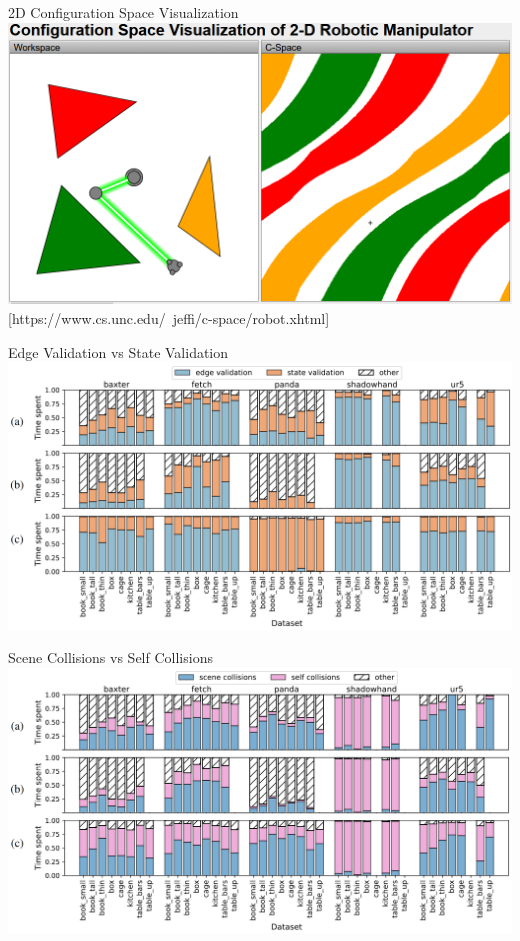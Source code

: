 \documentclass{beamer}
\begin{document}
\begin{frame}{2D Configuration Space Visualization}
\includegraphics[width=\textwidth]{./assets/c_space.png}
[https://www.cs.unc.edu/~jeffi/c-space/robot.xhtml]
\end{frame}

\begin{frame}{Edge Validation vs State Validation}
\includegraphics[width=\textwidth]{./assets/ev_sv_zoom.png}
\end{frame}

\begin{frame}{Scene Collisions vs Self Collisions}
\includegraphics[width=\textwidth]{./assets/sc_sc_zoom.png}
\end{frame}
\end{document}
